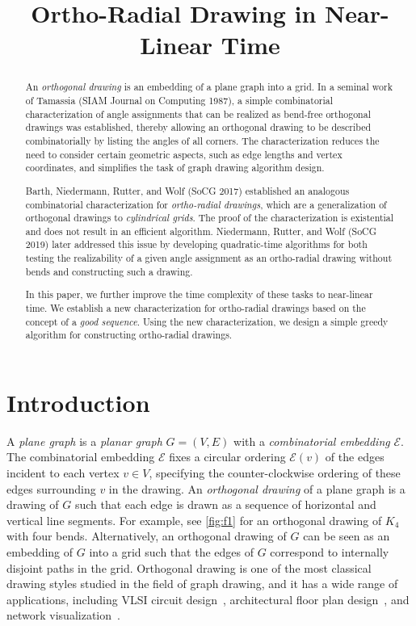 \documentclass{theoretics}
\title{Ortho-Radial Drawing in Near-Linear Time}
\newcommand{\EE}{\mathcal{E}}
\begin{document}
\maketitle

\begin{abstract}
An \emph{orthogonal drawing} is an embedding of a plane graph into a grid. In a seminal work of Tamassia (SIAM Journal on Computing 1987), a simple combinatorial characterization of angle assignments that can be realized as bend-free orthogonal drawings was established, thereby allowing an orthogonal drawing to be described combinatorially by listing the angles of all corners. The characterization reduces the need to consider certain geometric aspects, such as edge lengths and vertex coordinates, and simplifies the task of graph drawing algorithm design.

Barth, Niedermann, Rutter, and Wolf (SoCG 2017) established an analogous combinatorial characterization for \emph{ortho-radial drawings}, which are a generalization of orthogonal drawings to \emph{cylindrical grids}. The proof of the characterization is existential and does not result in  an efficient algorithm. Niedermann, Rutter, and Wolf (SoCG 2019) later addressed this issue by developing quadratic-time algorithms for both testing the realizability of a given angle assignment as an ortho-radial drawing without bends and constructing such a drawing.

In this paper, we further improve the time complexity of these tasks to near-linear time. We establish a new characterization for ortho-radial drawings based on the concept of a \emph{good sequence}. Using the new characterization, we design a simple greedy algorithm for constructing ortho-radial drawings.
\end{abstract}


\section{Introduction}\label{sect:intro}

A \emph{plane graph} is a \emph{planar graph} $G=(V,E)$ with a \emph{combinatorial embedding} $\EE$. The combinatorial embedding $\EE$ fixes a circular ordering $\EE(v)$ of the edges incident to each vertex $v \in V$, specifying the counter-clockwise ordering of these edges surrounding $v$ in the drawing.
An \emph{orthogonal drawing} of a plane graph is a drawing of $G$ such that each edge is drawn as a sequence of horizontal and vertical line segments. For example, see \cref{fig:f1} for an orthogonal drawing of $K_4$ with four bends. Alternatively, an orthogonal drawing of $G$ can be seen as an embedding of $G$ into a grid such that the edges of $G$ correspond to internally disjoint paths in the grid.
Orthogonal drawing is one of the most classical drawing styles studied in the field of graph drawing, and it has a wide range of applications, including VLSI circuit design~\cite{bhatt1984framework,valiant1981universality}, architectural floor plan design~\cite{LIGGETT1981277}, and network visualization~\cite{batini1986layout,eiglsperger2004automatic,gutwenger2003new,kieffer2015hola}.
\end{document}
